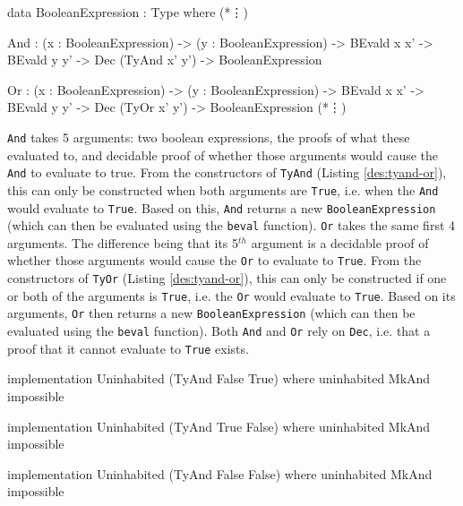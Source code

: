     \begin{code}[caption={The definitions of \texttt{And} and \texttt{Or}}, escapeinside={(*}{*)}]
            data BooleanExpression : Type where
                (*\vdots*)
                
                And :  (x : BooleanExpression)
                    -> (y : BooleanExpression)
                    -> BEvald x x'
                    -> BEvald y y'
                    -> Dec (TyAnd x' y')
                    -> BooleanExpression
                
                Or  :  (x : BooleanExpression)
                    -> (y : BooleanExpression)
                    -> BEvald x x'
                    -> BEvald y y'
                    -> Dec (TyOr x' y')
                    -> BooleanExpression
                (*\vdots*)
    \end{code}

    \texttt{And} takes 5 arguments: two boolean expressions, the proofs of what these evaluated to, and decidable proof of whether those arguments would cause the \texttt{And} to evaluate to true. From the constructors of \texttt{TyAnd} (Listing \ref{des:tyand-or}), this can only be constructed when both arguments are \texttt{True}, i.e. when the \texttt{And} would evaluate to \texttt{True}. Based on this, \texttt{And} returns a new \texttt{BooleanExpression} (which can then be evaluated using the \texttt{beval} function). \texttt{Or} takes the same first 4 arguments. The difference being that its 5$^{th}$ argument is a decidable proof of whether those arguments would cause the \texttt{Or} to evaluate to \texttt{True}. From the constructors of \texttt{TyOr} (Listing \ref{des:tyand-or}), this can only be constructed if one or both of the arguments is \texttt{True}, i.e. the \texttt{Or} would evaluate to \texttt{True}. Based on its arguments, \texttt{Or} then returns a new \texttt{BooleanExpression} (which can then be evaluated using the \texttt{beval} function). Both \texttt{And} and \texttt{Or} rely on \texttt{Dec}, i.e. that a proof that it cannot evaluate to \texttt{True} exists.
    
    \begin{code}[caption={Impossible \texttt{And} cases}]
        implementation Uninhabited (TyAnd False True) where
            uninhabited MkAnd impossible
            
        implementation Uninhabited (TyAnd True False) where
            uninhabited MkAnd impossible
            
        implementation Uninhabited (TyAnd False False) where
            uninhabited MkAnd impossible
    \end{code}

